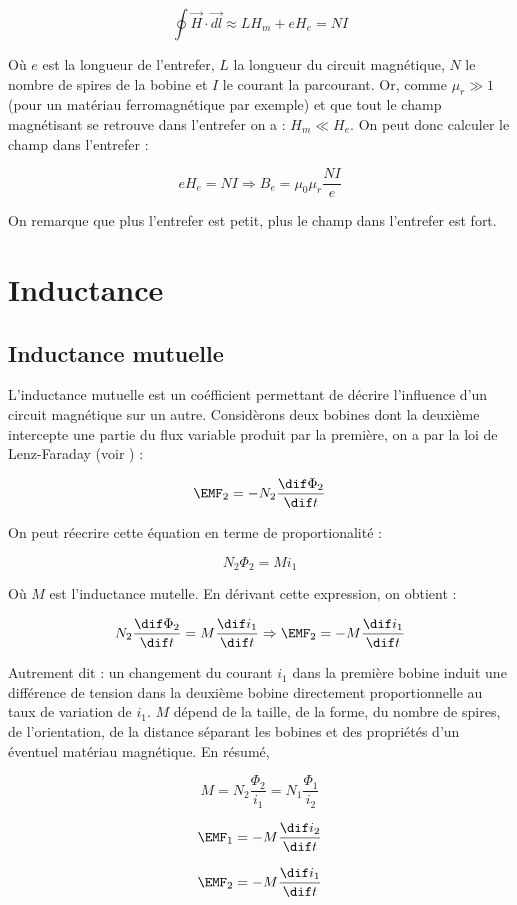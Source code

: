 \[ \oint \vec{H} \cdot \vec{dl} \approx LH_m + eH_e = NI\]

Où $e$ est la longueur de l'entrefer, $L$ la longueur du circuit magnétique, $N$
le nombre de spires de la bobine et $I$ le courant la parcourant.
Or, comme $\mu_r \gg 1$ (pour un matériau ferromagnétique par exemple) et que
tout le champ magnétisant se retrouve dans l'entrefer on a : $H_m \ll H_e$.
On peut donc calculer le champ dans l'entrefer :

\[ eH_e = NI \Rightarrow B_e = \mu_0\mu_r \frac{NI}{e} \]

On remarque que plus l'entrefer est petit, plus le champ dans l'entrefer est
fort.

\section{Inductance}
\subsection{Inductance mutuelle}
L'inductance mutuelle est un coéfficient permettant de décrire l'influence d'un circuit
magnétique sur un autre. Considèrons deux bobines dont la deuxième intercepte une partie
du flux variable produit par la première, on a par la loi de Lenz-Faraday (voir ) :

\[ \EMF_2 = -N_2 \frac{\dif \Phi_2}{\dif t} \]

On peut réecrire cette équation en terme de proportionalité :

\[ N_2 \Phi_2 = M i_1 \]

Où $M$ est l'inductance mutelle. En dérivant cette expression, on obtient :

\[ N_2 \frac{\dif \Phi_2}{\dif t} = M \frac{\dif i_1}{\dif t} \Rightarrow \EMF_2 = -M \frac{\dif i_1}{\dif t} \]

Autrement dit : un changement du courant $i_1$ dans la première
bobine induit une différence de tension dans la deuxième bobine directement proportionnelle
au taux de variation de $i_1$. $M$ dépend de la taille, de la forme, du nombre de spires, de l'orientation,
de la distance séparant les bobines et des propriétés d'un éventuel matériau magnétique.
En résumé,

\[ M = N_2 \frac{\Phi_2}{i_1} = N_1 \frac{\Phi_1}{i_2} \]

\[ \EMF_1 = -M \frac{\dif i_2}{\dif t} \]

\[ \EMF_2 = -M \frac{\dif i_1}{\dif t} \]

